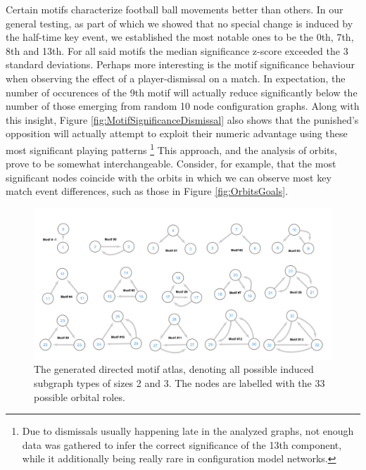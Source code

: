 \documentclass[9pt,twocolumn,twoside]{pnas-report}
\begin{document}
Certain motifs characterize football ball movements better than others. In our general testing, as part of which we showed that no special change is induced by the half-time key event, we established the most notable ones to be the 0th, 7th, 8th and 13th. For all said motifs the median significance z-score exceeded the 3 standard deviations. Perhaps more interesting is the motif significance behaviour when observing the effect of a player-dismissal on a match. In expectation, the number of occurences of the 9th motif will actually reduce significantly below the number of those emerging from random 10 node configuration graphs. Along with this insight, Figure \ref{fig:MotifSignificanceDismissal} also shows that the punished's opposition will actually attempt to exploit their numeric advantage using these most significant playing patterns \footnote{Due to dismissals usually happening late in the analyzed graphs, not enough data was gathered to infer the correct significance of the 13th component, while it additionally being really rare in configuration model networks.} This approach, and the analysis of orbits, prove to be somewhat interchangeable. Consider, for example, that the most significant nodes coincide with the orbits in which we can observe most key match event differences, such as those in Figure \ref{fig:OrbitsGoals}.
 
\begin{figure}[t]\centering
	\includegraphics[width=\linewidth]{motifs.png}
	\caption{The generated directed motif atlas, denoting all possible induced subgraph types of sizes 2 and 3. The nodes are labelled with the 33 possible orbital roles.}
	\label{fig:motifs}
\end{figure}
\end{document}
